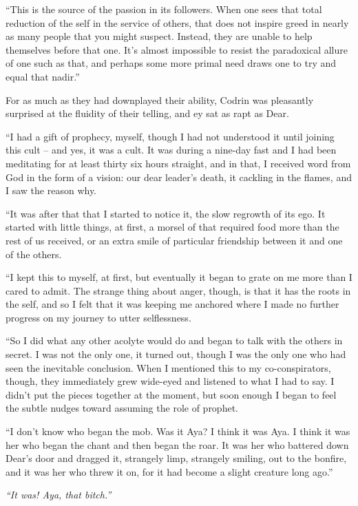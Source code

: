 ``This is the source of the passion in its followers. When one sees that total reduction of the self in the service of others, that does not inspire greed in nearly as many people that you might suspect. Instead, they are unable to help themselves before that one. It's almost impossible to resist the paradoxical allure of one such as that, and perhaps some more primal need draws one to try and equal that nadir.''

For as much as they had downplayed their ability, Codrin was pleasantly surprised at the fluidity of their telling, and ey sat as rapt as Dear.

``I had a gift of prophecy, myself, though I had not understood it until joining this cult -- and yes, it was a cult. It was during a nine-day fast and I had been meditating for at least thirty six hours straight, and in that, I received word from God in the form of a vision: our dear leader's death, it cackling in the flames, and I saw the reason why.

``It was after that that I started to notice it, the slow regrowth of its ego. It started with little things, at first, a morsel of that required food more than the rest of us received, or an extra smile of particular friendship between it and one of the others.

``I kept this to myself, at first, but eventually it began to grate on me more than I cared to admit. The strange thing about anger, though, is that it has the roots in the self, and so I felt that it was keeping me anchored where I made no further progress on my journey to utter selflessness.

``So I did what any other acolyte would do and began to talk with the others in secret. I was not the only one, it turned out, though I was the only one who had seen the inevitable conclusion. When I mentioned this to my co-conspirators, though, they immediately grew wide-eyed and listened to what I had to say. I didn't put the pieces together at the moment, but soon enough I began to feel the subtle nudges toward assuming the role of prophet.

``I don't know who began the mob. Was it Aya? I think it was Aya. I think it was her who began the chant and then began the roar. It was her who battered down Dear's door and dragged it, strangely limp, strangely smiling, out to the bonfire, and it was her who threw it on, for it had become a slight creature long ago.''

\emph{``It was! Aya, that bitch.''}

